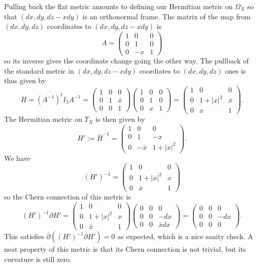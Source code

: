 \documentclass[10pt,a4paper]{article}
\begin{document}
Pulling back the flat metric amounts to defining our Hermitian metric on $\Omega_X$ so that $(dx, dy, dz - xdy)$ is an orthonormal frame. The matrix of the map from $(dx, dy, dz)$ coordinates to $(dx, dy, dz - xdy)$ is
$$
A = \begin{pmatrix}
1 & 0 & 0 \\
0 & 1 & 0 \\
0 & -x & 1
\end{pmatrix}
$$
so its inverse gives the coordinate change going the other way. The pullback of the standard metric in $(dx, dy, dz-x dy)$ coordiates to $(dx, dy, dz)$ ones is thus given by
$$
H = \overline{(A^{-1})^t} I_3 A^{-1}
=
\begin{pmatrix}
1 & 0 & 0 \\
0 & 1 & \bar x \\
0 & 0 & 1
\end{pmatrix}
\begin{pmatrix}
1 & 0 & 0 \\
0 & 1 & 0 \\
0 & x & 1
\end{pmatrix}
=
\begin{pmatrix}
1 & 0 & 0 \\
0 & 1+|x|^2 & \bar x \\
0 & x & 1
\end{pmatrix}.
$$
The Hermitian metric on $T_X$ is then given by
$$
H' := \overline{H}^{-1}
= \begin{pmatrix}
1 & 0 & 0 \\
0 & 1 & - x \\
0 & -\bar x & 1+|x|^2
\end{pmatrix}.
$$
We have
$$
(H')^{-1} = \begin{pmatrix}
  1 & 0 & 0 \\
  0 & 1 + |x|^2 & x \\
  0 & \bar x & 1
\end{pmatrix}
$$
so the Chern connection of this metric is
$$
(H')^{-1} \partial H'
= \begin{pmatrix}
  1 & 0 & 0 \\
  0 & 1 + |x|^2 & x \\
  0 & \bar x & 1
\end{pmatrix}
\begin{pmatrix}
0 & 0 & 0 \\
0 & 0 & -dx \\
0 & 0 & \bar x dx
\end{pmatrix}
= \begin{pmatrix}
0 & 0 & 0 \\
0 & 0 & -dx \\
0 & 0 & 0
\end{pmatrix}.
$$
This satisfies $\bar\partial((H')^{-1} \partial H') = 0$ as expected, which is a nice sanity check. A neat property of this metric is that its Chern connection is not trivial, but its curvature is still zero.
\end{document}
